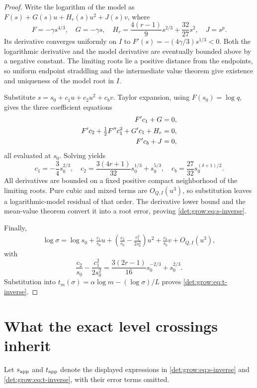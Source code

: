 \documentclass[11pt,letterpaper]{article}
\numberwithin{equation}{section}
\theoremstyle{definition}\newtheorem{definition}[theorem]{Definition}
\theoremstyle{remark}\newtheorem{remark}[theorem]{Remark}
\begin{document}
\begin{proof}
Write the logarithm of the model as
$F(s)+G(s)u+H_r(s)u^2+J(s)v$, where
\[
 F=-\gamma s^{4/3},\quad G=-\gamma s,\quad
 H_r=\frac{4(r-1)}9s^{2/3}+\frac{32}{27}s^2,\quad J=s^p.
\]
Its derivative converges uniformly on $I$ to
$F'(s)=-(4\gamma/3)s^{1/3}<0$. Both the logarithmic derivative and the
model derivative are eventually bounded above by a negative constant.
The limiting roots lie a positive distance from the endpoints, so
uniform endpoint straddling and the intermediate value theorem give
existence and uniqueness of the model root in $I$.

Substitute $s=s_0+c_1u+c_2u^2+c_bv$. Taylor expansion, using
$F(s_0)=\log q$, gives the three coefficient equations
\begin{align}\label{det:grow:eq:inverse-identities}
 F'c_1+G&=0,\\
 F'c_2+\tfrac12F''c_1^2+G'c_1+H_r&=0,\notag\\
 F'c_b+J&=0,\notag
\end{align}
all evaluated at $s_0$. Solving yields
\begin{equation}\label{det:grow:eq:inverse-coeff}
 c_1=-\frac34s_0^{2/3},\quad
 c_2=\frac{3(4r+1)}{32}s_0^{1/3}+s_0^{5/3},\quad
 c_b=\frac{27}{32}s_0^{(\delta+1)/2}.
\end{equation}
All derivatives are bounded on a fixed positive compact neighborhood
of the limiting roots. Pure cubic and mixed terms are $O_{Q,I}(u^3)$,
so substitution leaves a logarithmic-model residual of that order.
The derivative lower bound and the mean-value theorem convert it into
a root error, proving \eqref{det:grow:eq:s-inverse}.

Finally,
\begin{align*}
 \log\sigma=\log s_0+\frac{c_1}{s_0}u
 +\left(\frac{c_2}{s_0}-\frac{c_1^2}{2s_0^2}\right)u^2
 +\frac{c_b}{s_0}v+O_{Q,I}(u^3),
\end{align*}
with
\[
 \frac{c_2}{s_0}-\frac{c_1^2}{2s_0^2}
 =\frac{3(2r-1)}{16}s_0^{-2/3}+s_0^{2/3}.
\]
Substitution into $t_m(\sigma)=\alpha\log m-(\log\sigma)/L$ proves
\eqref{det:grow:eq:t-inverse}.
\end{proof}

\section{What the exact level crossings inherit}
Let $s_{\rm app}$ and $t_{\rm app}$ denote the displayed expressions in
\eqref{det:grow:eq:s-inverse} and \eqref{det:grow:eq:t-inverse}, with their error terms
omitted.
\end{document}
